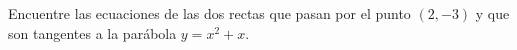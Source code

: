 \item Encuentre las ecuaciones de las dos rectas que pasan por el punto $(2, -3)$ y que son tangentes a la parábola $y = x^2 + x$.
